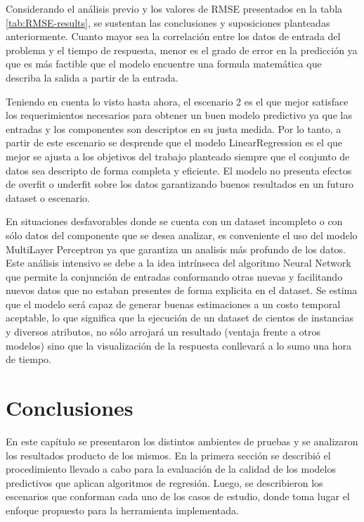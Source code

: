 Considerando el análisis previo y los valores de \ac{RMSE} presentados
en la tabla \ref{tab:RMSE-results}, se sustentan las conclusiones
y suposiciones planteadas anteriormente. Cuanto mayor sea la correlación
entre los datos de entrada del problema y el tiempo de respuesta,
menor es el grado de error en la predicción ya que es más factible
que el modelo encuentre una formula matemática que describa la salida
a partir de la entrada.

Teniendo en cuenta lo visto hasta ahora, el escenario 2 es el que
mejor satisface los requerimientos necesarios para obtener un buen
modelo predictivo ya que las entradas y los componentes son descriptos
en su justa medida. Por lo tanto, a partir de este escenario se desprende
que el modelo LinearRegression es el que mejor se ajusta a los objetivos
del trabajo planteado siempre que el conjunto de datos sea descripto
de forma completa y eficiente. El modelo no presenta efectos de overfit
o underfit sobre los datos garantizando buenos resultados en un futuro
dataset o escenario.

En situaciones desfavorables donde se cuenta con un dataset incompleto
o con sólo datos del componente que se desea analizar, es conveniente
el uso del modelo MultiLayer Perceptron ya que garantiza un analisis
más profundo de los datos. Este análisis intensivo se debe a la idea
intrínseca del algoritmo Neural Network que permite la conjunción
de entradas conformando otras nuevas y facilitando nuevos datos que
no estaban presentes de forma explicita en el dataset. Se estima que
el modelo será capaz de generar buenas estimaciones a un costo temporal
aceptable, lo que significa que la ejecución de un dataset de cientos
de instancias y diversos atributos, no sólo arrojará un resultado
(ventaja frente a otros modelos) sino que la visualización de la respuesta
conllevará a lo sumo una hora de tiempo. 


\section{Conclusiones \label{sec:Conclusiones}}

En este capítulo se presentaron los distintos ambientes de pruebas
y se analizaron los resultados producto de los mismos. En la primera
sección se describió el procedimiento llevado a cabo para la evaluación
de la calidad de los modelos predictivos que aplican algoritmos de
regresión. Luego, se describieron los escenarios que conforman cada
uno de los casos de estudio, donde toma lugar el enfoque propuesto
para la herramienta implementada. 

